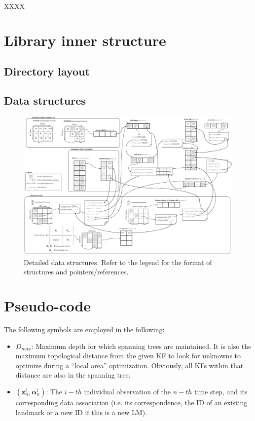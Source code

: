 \documentclass[a4paper,11pt]{article}
\begin{document}
XXXX

\section{Library inner structure}

\subsection{Directory layout}


\subsection{Data structures}

\begin{figure}
\centering
\includegraphics[width=1.0\textwidth]{imgs/srba_data_structures.pdf} 
\caption{Detailed data structures. Refer to the legend for the format of structures and pointers/references.}
\label{fig:detailed.data.structures}
\end{figure}



\newpage
\section{Pseudo-code}

The following symbols are employed in the following:

\begin{itemize}
\item{$D_{max}$: Maximum depth for which spanning trees are maintained. It is also the maximum topological distance 
   from the given KF to look for unknowns to optimize during a ``local area'' optimization. Obviously, all KFs within 
   that distance are also in the spanning tree.}
\item{$(\mathbf{z}_n^i,\mathbf{\alpha}_n^i)$: The $i-th$ individual observation of the $n-th$ time step, and 
  its corresponding data association (i.e. its correspondence, the ID of an existing landmark or a new ID if this 
  is a new LM).}
\end{itemize}
\end{document}
